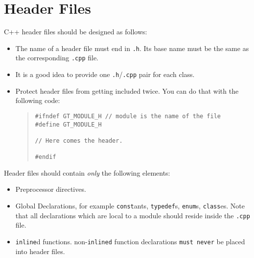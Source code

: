 %
%

\section{Header Files}

C++ header files should be designed as follows:

\begin{itemize}

  \item 
  The name of a header file must end in \texttt{.h}.  Its base name 
  must be the same as the corresponding \texttt{.cpp} file.

  \item 
  It is a good idea to provide one \texttt{.h}/\texttt{.cpp} pair for 
  each class.

  \item 
  Protect header files from getting included twice. You can do that with
  the following code:

  \begin{quote}
\begin{verbatim}
#ifndef GT_MODULE_H // module is the name of the file
#define GT_MODULE_H

// Here comes the header.

#endif
\end{verbatim}
  \end{quote}

\end{itemize}

\noindent Header files should contain \emph{only} the following elements:

\begin{itemize}

  \item 
  Preprocessor directives.

  \item 
  Global Declarations, for example \texttt{const}ants, 
  \texttt{typedef}s, \texttt{enum}s, \texttt{class}es.  Note that all 
  declarations which are local to a module should reside inside the 
  \texttt{.cpp} file.
  
  \item
  \texttt{inline}d functions.  non-\texttt{inlined} function 
  declarations \texttt{must never} be placed into header files.

\end{itemize}



%
%

